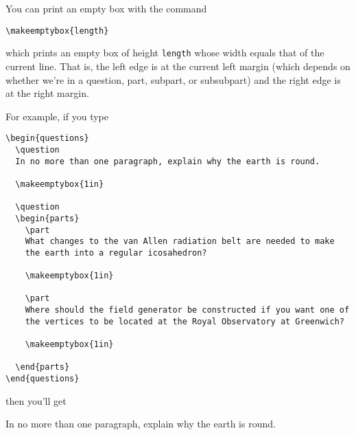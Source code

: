 \documentclass[12pt]{exam}
\begin{document}
You can print an empty box with the command
\begin{center}
  \verb"\makeemptybox{length}"
\end{center}
which prints an empty box of height \verb"length" whose width equals
that of the current line.  That is, the left edge is at the current
left margin (which depends on whether we're in a question, part,
subpart, or subsubpart) and the right edge is at the right margin.

\medskip

For example, if you type
\begin{verbatim}
\begin{questions}
  \question 
  In no more than one paragraph, explain why the earth is round.

  \makeemptybox{1in}
  
  \question
  \begin{parts}
    \part
    What changes to the van Allen radiation belt are needed to make
    the earth into a regular icosahedron?

    \makeemptybox{1in}

    \part
    Where should the field generator be constructed if you want one of
    the vertices to be located at the Royal Observatory at Greenwich?

    \makeemptybox{1in}

  \end{parts}
\end{questions}
\end{verbatim}
then you'll get
\begin{questions}
  \question 
  In no more than one paragraph, explain why the earth is round.

  \makeemptybox{1in}
  
  \question
\end{questions}
\end{document}
